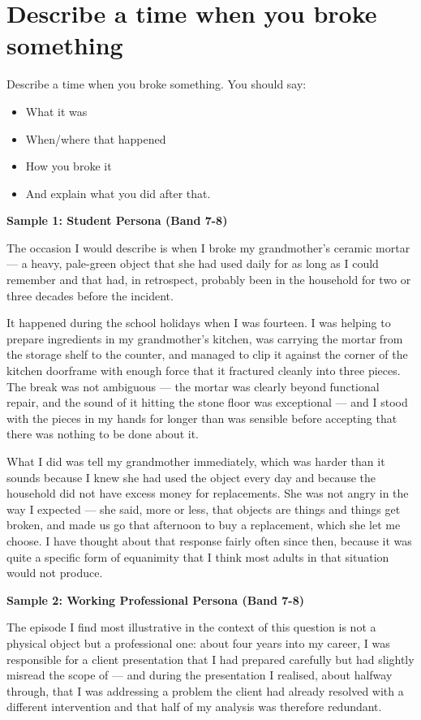 \section{Describe a time when you broke something}
\begin{ieltsprompt}
Describe a time when you broke something.
You should say:
\begin{itemize}[leftmargin=2em, itemsep=2pt]
\item What it was
\item When/where that happened
\item How you broke it
\item And explain what you did after that.
\end{itemize}
\end{ieltsprompt}
\begin{ieltsanswer}
\textbf{Sample 1: Student Persona (Band 7-8)}

The occasion I would describe is when I broke my grandmother's ceramic mortar — a heavy, pale-green object that she had used daily for as long as I could remember and that had, in retrospect, probably been in the household for two or three decades before the incident.

It happened during the school holidays when I was fourteen. I was helping to prepare ingredients in my grandmother's kitchen, was carrying the mortar from the storage shelf to the counter, and managed to clip it against the corner of the kitchen doorframe with enough force that it fractured cleanly into three pieces. The break was not ambiguous — the mortar was clearly beyond functional repair, and the sound of it hitting the stone floor was exceptional — and I stood with the pieces in my hands for longer than was sensible before accepting that there was nothing to be done about it.

What I did was tell my grandmother immediately, which was harder than it sounds because I knew she had used the object every day and because the household did not have excess money for replacements. She was not angry in the way I expected — she said, more or less, that objects are things and things get broken, and made us go that afternoon to buy a replacement, which she let me choose. I have thought about that response fairly often since then, because it was quite a specific form of equanimity that I think most adults in that situation would not produce.

\textbf{Sample 2: Working Professional Persona (Band 7-8)}

The episode I find most illustrative in the context of this question is not a physical object but a professional one: about four years into my career, I was responsible for a client presentation that I had prepared carefully but had slightly misread the scope of — and during the presentation I realised, about halfway through, that I was addressing a problem the client had already resolved with a different intervention and that half of my analysis was therefore redundant.


\end{ieltsanswer}
